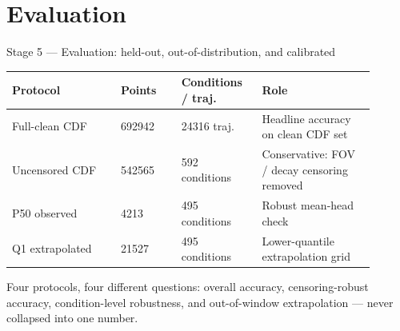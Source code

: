 \documentclass[aspectratio=169,11pt]{beamer}
\begin{document}
\section{Evaluation}

\begin{frame}{Stage 5 --- Evaluation: held-out, out-of-distribution, and calibrated}
\small
\begin{tabular}{L{0.27\linewidth}R{0.15\linewidth}R{0.20\linewidth}L{0.28\linewidth}}
\toprule
Protocol & Points & Conditions / traj. & Role \\
\midrule
Full-clean CDF & \num{692942} & \num{24316} traj. & Headline accuracy on clean CDF set \\
Uncensored CDF & \num{542565} & 592 conditions & Conservative: FOV / decay censoring removed \\
P50 observed & \num{4213} & 495 conditions & Robust mean-head check \\
Q1 extrapolated & \num{21527} & 495 conditions & Lower-quantile extrapolation grid \\
\bottomrule
\end{tabular}

\vspace{0.5em}
\footnotesize
Four protocols, four different questions: overall accuracy, censoring-robust accuracy,
condition-level robustness, and out-of-window extrapolation --- never collapsed into one number.

\end{frame}
\end{document}
